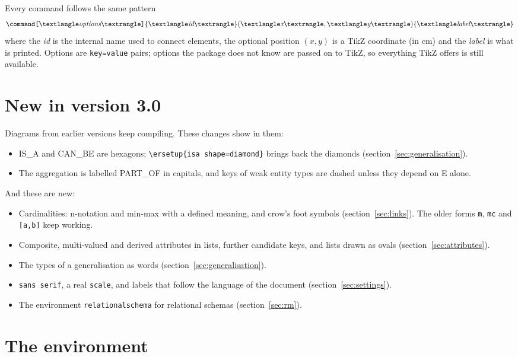 \documentclass[10pt,a4paper]{article}
\newcommand\cs[1]{\texttt{\textbackslash#1}}
\newcommand\meta[1]{\textlangle\textit{#1}\textrangle}
\newcommand\opt[1]{\texttt{[}#1\texttt{]}}
\begin{document}
Every command follows the same pattern
\[
  \cs{command}\opt{\meta{options}}\{\meta{id}\}(\meta{x},\meta{y})\{\meta{label}\}
\]
where the \meta{id} is the internal name used to connect elements, the
optional position $(x,y)$ is a TikZ coordinate (in cm) and the
\meta{label} is what is printed. Options are \texttt{key=value} pairs;
options the package does not know are passed on to TikZ, so everything
TikZ offers is still available.

\section{New in version 3.0}

Diagrams from earlier versions keep compiling. These changes show in them:

\begin{itemize}
\item IS\_A and CAN\_BE are hexagons; \verb|\ersetup{isa shape=diamond}| brings back the
  diamonds (section~\ref{sec:generalisation}).
\item The aggregation is labelled PART\_OF in capitals, and keys of weak entity types are dashed
  unless they depend on E alone.
\end{itemize}

And these are new:

\begin{itemize}
\item Cardinalities: n-notation and min-max with a defined meaning, and crow's foot symbols
  (section~\ref{sec:links}). The older forms \texttt{m}, \texttt{mc} and \texttt{[a,b]} keep working.
\item Composite, multi-valued and derived attributes in lists, further candidate keys, and lists drawn as
  ovals (section~\ref{sec:attributes}).
\item The types of a generalisation as words (section~\ref{sec:generalisation}).
\item \texttt{sans serif}, a real \texttt{scale}, and labels that follow the language of the document
  (section~\ref{sec:settings}).
\item The environment \texttt{relationalschema} for relational schemas (section~\ref{sec:rm}).
\end{itemize}

\section{The environment}
\end{document}
